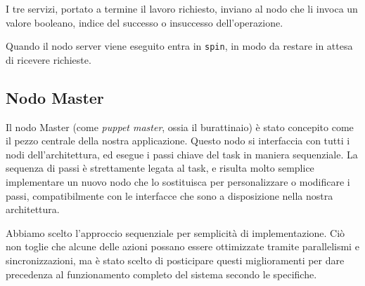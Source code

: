 I tre servizi, portato a termine il lavoro richiesto, inviano al nodo che li invoca un valore booleano, indice del successo o insuccesso dell'operazione.

Quando il nodo server viene eseguito entra in \verb|spin|, in modo da restare in attesa di ricevere richieste. 
\begin{comment} Se killo il nodo server il servizio risulta comunque irraggiungibile (la wait for service va in timeout), quindi stoppando il server viene comunque stoppato il servizio.\end{comment}


\subsection{Nodo Master}

Il nodo Master (come \emph{puppet master}, ossia il burattinaio) è stato concepito come il pezzo centrale della nostra applicazione. Questo nodo si interfaccia con tutti i nodi dell'architettura, ed esegue i passi chiave del task in maniera sequenziale. La sequenza di passi è strettamente legata al task, e risulta molto semplice implementare un nuovo nodo che lo sostituisca per personalizzare o modificare i passi, compatibilmente con le interfacce che sono a disposizione nella nostra architettura.

Abbiamo scelto l'approccio sequenziale per semplicità di implementazione. Ciò non toglie che alcune delle azioni possano essere ottimizzate tramite parallelismi e sincronizzazioni, ma è stato scelto di posticipare questi miglioramenti per dare precedenza al funzionamento completo del sistema secondo le specifiche.


